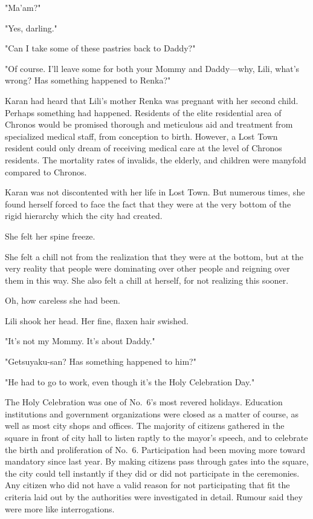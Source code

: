 "Ma'am?"

"Yes, darling."

"Can I take some of these pastries back to Daddy?"

"Of course. I'll leave some for both your Mommy and Daddy---why, Lili,
what's wrong? Has something happened to Renka?"

Karan had heard that Lili's mother Renka was pregnant with her second
child. Perhaps something had happened. Residents of the elite
residential area of Chronos would be promised thorough and meticulous
aid and treatment from specialized medical staff, from conception to
birth. However, a Lost Town resident could only dream of receiving
medical care at the level of Chronos residents. The mortality rates of
invalids, the elderly, and children were manyfold compared to Chronos.

Karan was not discontented with her life in Lost Town. But numerous
times, she found herself forced to face the fact that they were at the
very bottom of the rigid hierarchy which the city had created.

She felt her spine freeze.

She felt a chill not from the realization that they were at the bottom,
but at the very reality that people were dominating over other people
and reigning over them in this way. She also felt a chill at herself,
for not realizing this sooner.

Oh, how careless she had been.

Lili shook her head. Her fine, flaxen hair swished.

"It's not my Mommy. It's about Daddy."

"Getsuyaku-san? Has something happened to him?"

"He had to go to work, even though it's the Holy Celebration Day."

The Holy Celebration was one of No.~6's most revered holidays. Education
institutions and government organizations were closed as a matter of
course, as well as most city shops and offices. The majority of citizens
gathered in the square in front of city hall to listen raptly to the
mayor's speech, and to celebrate the birth and proliferation of No.~6.
Participation had been moving more toward mandatory since last year. By
making citizens pass through gates into the square, the city could tell
instantly if they did or did not participate in the ceremonies. Any
citizen who did not have a valid reason for not participating that fit
the criteria laid out by the authorities were investigated in detail.
Rumour said they were more like interrogations.

